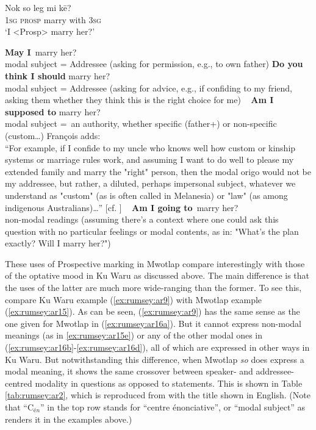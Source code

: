 \documentclass[output=paper]{langsci/langscibook}
\begin{document}
\begin{exe}
	\ex \label{ex:rumsey:ar16}
	\gll Nok so leg mi kē?\\
	1\textsc{sg} \textsc{prosp} marry with 3\textsc{sg}\\
	\trans ‘I <Prosp> marry her?’

\begin{xlist}
	\ex\label{ex:rumsey:ar16a} \textbf{May I} marry her? \\modal subject = Addressee (asking for permission, e.g., to own father)
	\ex\label{ex:rumsey:ar16b} \textbf{Do you think I should} marry her? \\modal subject = Addressee (asking for advice, e.g., if confiding to my friend, asking them whether they think this is the right choice for me)
  	\ex\label{ex:rumsey:ar16c} \textbf{Am I supposed to} marry her? \\modal subject = an authority, whether specific (father+) or non-specific (custom…) François adds:\\ “For example, if I confide to my uncle who knows well how custom or kinship systems or marriage rules work, and assuming I want to do well to please my extended family and marry the "right" person, then the modal origo would not be my addressee, but rather, a diluted, perhaps impersonal subject, whatever we understand as "custom" (as is often called in Melanesia) or "law" (as among indigenous Australians)…” [cf. \citealt[229]{Francois2003}]
  	\ex\label{ex:rumsey:ar16d} \textbf{Am I going to} marry her? \\ non-modal readings (assuming there's a context where one could ask this question with no particular feelings or modal contents, as in: "What's the plan exactly? Will I marry her?")
\end{xlist}
\end{exe}

These uses of Prospective marking in Mwotlap compare interestingly with those of the optative mood in Ku Waru as discussed above. The main difference is that the uses of the latter are much more wide-ranging than the former. To see this, compare Ku Waru example (\ref{ex:rumsey:ar9}) with Mwotlap example (\ref{ex:rumsey:ar15}). As can be seen, (\ref{ex:rumsey:ar9}) has the same sense as the one given for Mwotlap in (\ref{ex:rumsey:ar16a}).  But it cannot express non-modal meanings (as in \ref{ex:rumsey:ar15e}) or any of the other modal ones in  (\ref{ex:rumsey:ar16b}-\ref{ex:rumsey:ar16d}), all of which are expressed in other ways in Ku Waru. But notwithstanding this difference, when Mwotlap \textit{so} does express a modal meaning, it shows the same crossover between speaker- and addressee-centred modality in questions as opposed to statements. This is shown in Table \ref{tab:rumsey:ar2}, which is reproduced from \cite{Francois2003} with the title shown in English. (Note that “C$_{én}$” in the top row stands for “centre énonciative”, or “modal subject” as \citeauthor{Francois2003} renders it in the examples above.)
\end{document}

